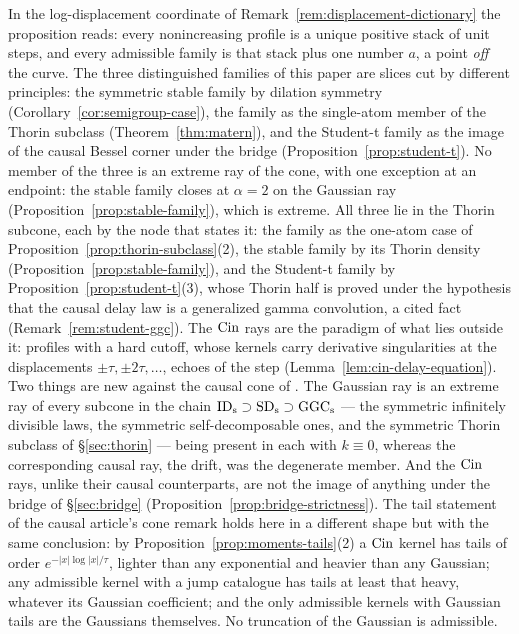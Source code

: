 \begin{remark}\label{rem:cone-shape}
In the log-displacement coordinate of Remark~\ref{rem:displacement-dictionary} the proposition
reads: every nonincreasing profile is a unique positive stack of unit steps, and every
admissible family is that stack plus one number $a$, a point \emph{off} the curve. The three
distinguished families of this paper are slices cut by different principles: the symmetric
stable family by dilation symmetry
(Corollary~\ref{cor:semigroup-case}), the \Matern{} family as the single-atom member of the
Thorin subclass (Theorem~\ref{thm:matern}), and the Student-t family as the image of the
causal Bessel corner under the bridge (Proposition~\ref{prop:student-t}). No member of the three
is an extreme ray of the cone, with one exception at an endpoint: the stable family closes at
$\alpha = 2$ on the Gaussian ray (Proposition~\ref{prop:stable-family}), which is extreme. All
three lie
in the Thorin subcone, each by the node that states it: the \Matern{} family as the one-atom
case of Proposition~\ref{prop:thorin-subclass}(2), the stable family by its Thorin density
(Proposition~\ref{prop:stable-family}), and the Student-t family by
Proposition~\ref{prop:student-t}(3), whose Thorin half is proved under the hypothesis that the
causal delay law is a generalized gamma convolution, a cited fact
(Remark~\ref{rem:student-ggc}).
The $\operatorname{Cin}$ rays are the paradigm of what lies outside it: profiles with a hard cutoff, whose
kernels carry derivative singularities at the displacements $\pm\tau, \pm2\tau, \dots$, echoes
of the step (Lemma~\ref{lem:cin-delay-equation}). Two things are new against the causal cone of
. The Gaussian ray is an extreme ray of every subcone in the
chain $\mathrm{ID}_{\mathrm{s}} \supset \mathrm{SD}_{\mathrm{s}} \supset \mathrm{GGC}_{\mathrm{s}}$ --- the symmetric infinitely divisible laws, the
symmetric self-decomposable ones, and the symmetric Thorin subclass of
\S\ref{sec:thorin} --- being present in each with $k \equiv 0$, whereas the
corresponding causal ray, the drift, was the degenerate member. And the $\operatorname{Cin}$ rays, unlike
their causal counterparts, are not the image of anything under the bridge of
\S\ref{sec:bridge} (Proposition~\ref{prop:bridge-strictness}). The tail statement of the causal
article's cone remark holds here in a different shape but with the same conclusion: by
Proposition~\ref{prop:moments-tails}(2) a $\operatorname{Cin}$ kernel has tails of order
$e^{-|x|\log|x|/\tau}$, lighter than any exponential and heavier than any Gaussian; any
admissible kernel with a jump catalogue has tails at least that heavy, whatever its Gaussian
coefficient; and the only admissible kernels with Gaussian tails are the Gaussians themselves.
No truncation of the Gaussian is admissible.
\end{remark}

